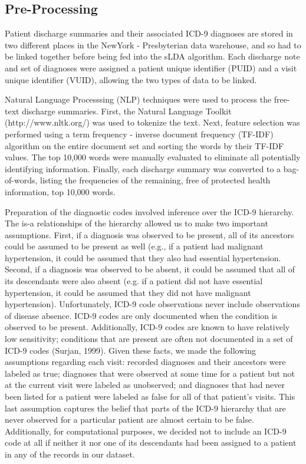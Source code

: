 \documentclass{article}
\begin{document}
\subsection{Pre-Processing}

Patient discharge summaries and their associated ICD-9 diagnoses are
stored in two different places in the NewYork - Presbyterian data
warehouse, and so had to be linked together before being fed into
the sLDA algorithm. Each discharge note and set of diagnoses were
assigned a patient unique identifier (PUID) and a visit unique identifier
(VUID), allowing the two types of data to be linked.

Natural Language Processsing (NLP) techniques were used to process
the free-text discharge summaries. First, the Natural Language Toolkit
(http://www.nltk.org/) was used to tokenize the text. Next, feature
selection was performed using a term frequency - inverse document
frequency (TF-IDF) algorithm on the entire document set and sorting
the words by their TF-IDF values. The top 10,000 words were manually
evaluated to eliminate all potentially identifying information. Finally,
each discharge summary was converted to a bag-of-words, listing the
frequencies of the remaining, free of protected health information,
top 10,000 words.

Preparation of the diagnostic codes involved inference over the ICD-9
hierarchy. The is-a relationships of the hierarchy allowed us to make
two important assumptions. First, if a diagnosis was observed to be
present, all of its ancestors could be assumed to be present as well
(e.g., if a patient had malignant hypertension, it could be assumed
that they also had essential hypertension. Second, if a diagnosis
was observed to be absent, it could be assumed that all of its descendants
were also absent (e.g. if a patient did not have essential hypertension,
it could be assumed that they did not have malignant hypertension).
Unfortunately, ICD-9 code observations never include observations
of disease absence. ICD-9 codes are only documented when the condition
is observed to be present. Additionally, ICD-9 codes are known to
have relatively low sensitivity; conditions that are present are often
not documented in a set of ICD-9 codes (Surjan, 1999). Given these
facts, we made the following assumptions regarding each visit: recorded
diagnoses and their ancestors were labeled as true; diagnoses that
were observed at some time for a patient but not at the current visit
were labeled as unobserved; and diagnoses that had never been listed
for a patient were labeled as false for all of that patient\textquoteright{}s
visits. This last assumption captures the belief that parts of the
ICD-9 hierarchy that are never observed for a particular patient are
almost certain to be false. Additionally, for computational purposes,
we decided not to include an ICD-9 code at all if neither it nor one
of its descendants had been assigned to a patient in any of the records
in our dataset.
\end{document}
